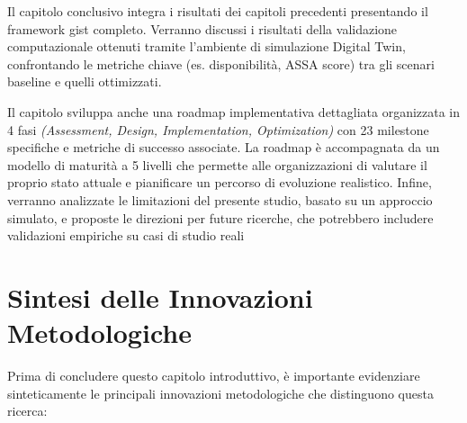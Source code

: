 




Il capitolo conclusivo integra i risultati dei capitoli precedenti presentando il framework \gls{gist} completo. Verranno discussi i risultati della validazione computazionale ottenuti tramite l'ambiente di simulazione Digital Twin, confrontando le metriche chiave (es. disponibilità, ASSA score) tra gli scenari baseline e quelli ottimizzati. 

Il capitolo sviluppa anche una roadmap implementativa dettagliata organizzata in 4 fasi \emph{(Assessment, Design, Implementation, Optimization)} con 23 milestone specifiche e metriche di successo associate. La roadmap è accompagnata da un modello di maturità a 5 livelli che permette alle organizzazioni di valutare il proprio stato attuale e pianificare un percorso di evoluzione realistico.
Infine, verranno analizzate le limitazioni del presente studio, basato su un approccio simulato, e proposte le direzioni per future ricerche, che potrebbero includere validazioni empiriche su casi di studio reali

\section{Sintesi delle Innovazioni Metodologiche}
\label{sec:sintesi_innovazioni}

Prima di concludere questo capitolo introduttivo, è importante evidenziare sinteticamente le principali innovazioni metodologiche che distinguono questa ricerca:

